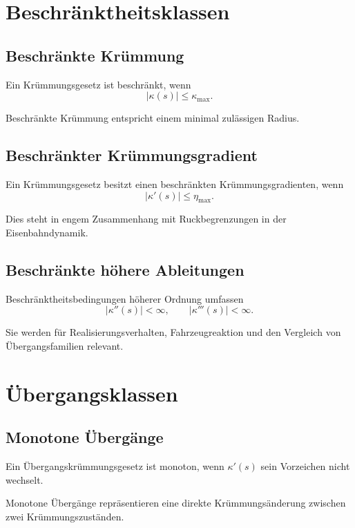 \section{Beschränktheitsklassen}

\subsection{Beschränkte Krümmung}
\begin{definition}
\label{def:bounded-curvature}
Ein Krümmungsgesetz ist beschränkt, wenn
\[
|\kappa(s)|\le\kappa_{\max}.
\]
\end{definition}
Beschränkte Krümmung entspricht einem minimal zulässigen Radius.

\subsection{Beschränkter Krümmungsgradient}
\begin{definition}
\label{def:bounded-curvature-gradient}
Ein Krümmungsgesetz besitzt einen beschränkten Krümmungsgradienten, wenn
\[
|\kappa'(s)|\le\eta_{\max}.
\]
\end{definition}
Dies steht in engem Zusammenhang mit Ruckbegrenzungen in der
Eisenbahndynamik.

\subsection{Beschränkte höhere Ableitungen}
\begin{definition}
\label{def:bounded-higher-curvature-derivatives}
Beschränktheitsbedingungen höherer Ordnung umfassen
\[
|\kappa''(s)|<\infty,\qquad |\kappa'''(s)|<\infty.
\]
\end{definition}
Sie werden für Realisierungsverhalten, Fahrzeugreaktion und den Vergleich von
Übergangsfamilien relevant.

\section{Übergangsklassen}

\subsection{Monotone Übergänge}
\begin{definition}
\label{def:monotone-transition}
Ein Übergangskrümmungsgesetz ist monoton, wenn \(\kappa'(s)\) sein Vorzeichen
nicht wechselt.
\end{definition}
Monotone Übergänge repräsentieren eine direkte Krümmungsänderung zwischen zwei
Krümmungszuständen.

